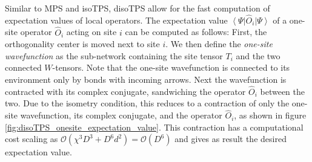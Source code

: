 Similar to MPS and isoTPS, disoTPS allow for the fast computation of expectation values of local operators. The expectation value $\left\langle\Psi\right|\hat{O}_i\left|\Psi\right\rangle$ of a one-site operator $\hat{O}_i$ acting on site $i$ can be computed as follows: First, the orthogonality center is moved next to site $i$. We then define the \textit{one-site wavefunction} as the sub-network containing the site tensor $T_i$ and the two connected $W$-tensors. Note that the one-site wavefunction is connected to its environment only by bonds with incoming arrows. Next the wavefunction is contracted with its complex conjugate, sandwiching the operator $\hat{O}_i$ between the two. Due to the isometry condition, this reduces to a contraction of only the one-site wavefunction, its complex conjugate, and the operator $\hat{O}_i$, as shown in figure \ref{fig:disoTPS_onesite_expectation_value}. This contraction has a computational cost scaling as $\mathcal{O}\left(\chi^3 D^3 + D^6d^2\right) = \mathcal{O}(D^6)$ and gives as result the desired expectation value. \par

